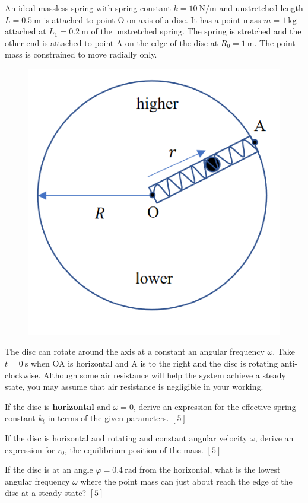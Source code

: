 \begin{problem}
    An ideal massless spring with spring constant $k = \qty{10}{\N\per\m}$ and unstretched length $L = \qty{0.5}{\m}$ is attached to point O on axis of a disc. It has a point mass $m = \qty{1}{\kg}$ attached at $L_1 = \qty{0.2}{\m}$ of the unstretched spring. The spring is stretched and the other end is attached to point A on the edge of the disc at $R_0 = \qty{1}{\m}$. The point mass is constrained to move radially only.
    \begin{figure}[H]
        \centering
        \includegraphics{spho_book_TYS_images/2021SPhO_9.png}
    \end{figure}
    The disc can rotate around the axis at a constant an angular frequency $\omega$. Take $t = \qty{0}{\s}$ when OA is horizontal and A is to the right and the disc is rotating anti-clockwise. Although some air resistance will help the system achieve a steady state, you may assume that air resistance is negligible in your working.
    \begin{subproblemalph}
        \item If the disc is \textbf{horizontal} and $\omega = 0$, derive an expression for the effective spring constant $k_t$ in terms of the given parameters. \hfill $[5]$
        \item If the disc is horizontal and rotating and constant angular velocity $\omega$, derive an expression for $r_0$, the equilibrium position of the mass. \hfill $[5]$
        \item If the disc is at an angle $\varphi = \qty{0.4}{\radian}$ from the horizontal, what is the lowest angular frequency $\omega$ where the point mass can just about reach the edge of the disc at a steady state? \hfill $[5]$
    \end{subproblemalph}
\end{problem}
